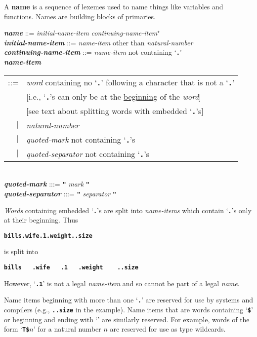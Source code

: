 \documentclass[12pt]{article}
\newcommand{\TT}[1]{{\tt \bfseries #1}}
\newcommand{\STAR}{{\Large $^\star$}}
\newcommand{\key}[1]{{\rm \bfseries #1}}
\newcommand{\emkey}[1]{{\em \bfseries #1}}
\newenvironment{indpar}[1][0.3in]%
	{\begin{list}{}%
		     {\setlength{\itemsep}{0in}%
		      \setlength{\topsep}{0in}%
		      \setlength{\parsep}{1ex}%
		      \setlength{\labelwidth}{#1}%
		      \setlength{\leftmargin}{#1}%
		      \addtolength{\leftmargin}{\labelsep}}%
	 \item}%
	{\end{list}}
\begin{document}
A \key{name} is a sequence of lexemes used to name things like
variables and functions.  Names are building blocks of primaries.

\begin{indpar}
\emkey{name}\label{NAME} ::=
    {\em initial-name-item} {\em continuing-name-item}\STAR{} \\
\emkey{initial-name-item} ::= {\em name-item} other than {\em natural-number} \\
\emkey{continuing-name-item} ::= {\em name-item} not containing `\TT{.}' \\
\emkey{name-item}\label{NAME-ITEM}
    \begin{tabular}[t]{@{}rl}
    ::= & {\em word} containing no `\TT{.}' following a character
                     that is not a `\TT{.}' \\
        & [i.e., `\TT{.}'s can only be at the \underline{beginning}
	   of the {\em word}] \\
        & [see text about splitting words with embedded `\TT{.}'s] \\
    $|$ & {\em natural-number} \\
    $|$ & {\em quoted-mark} not containing `\TT{.}'s \\
    $|$ & {\em quoted-separator} not containing `\TT{.}'s \\
    \end{tabular} \\
\emkey{quoted-mark} :::= \TT{"} {\em mark} \TT{"} \\
\emkey{quoted-separator} :::= \TT{"} {\em separator} \TT{"}
\end{indpar}

{\em Words} containing embedded `\TT{.}'s are split into
{\em name-items} which contain `\TT{.}'s only at their beginning.
Thus
\begin{center}
\TT{bills.wife.1.weight..size}
\end{center}
is split into
\begin{center}
\TT{bills~~~.wife~~~.1~~~.weight~~~~..size}
\end{center}
However, `\TT{.1}' is not a legal {\em name-item} and so cannot
be part of a legal {\em name}.

Name items beginning with more than one `\TT{.}' are reserved
for use by systems and compilers (e.g., \TT{..size} in the example).
Name items that are words containing `\TT{\$}' or
beginning and ending with `\TT{*}' are
similarly reserved.  For example, words of the form `\TT{T\$$n$}'
for a natural number $n$ are reserved for use as type wildcards.
\end{document}
